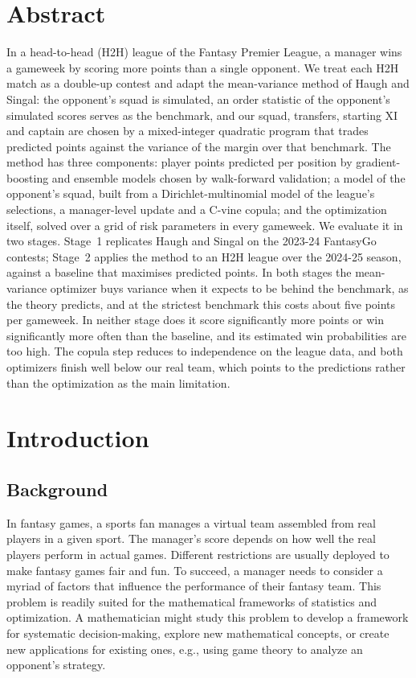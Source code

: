\documentclass[12pt,oneside,a4paper]{book}
\theoremstyle{definition}
\theoremstyle{remark}
\begin{document}
	\chapter*{Abstract}
	In a head-to-head (H2H) league of the Fantasy Premier League, a manager wins a gameweek by
	scoring more points than a single opponent. We treat each H2H match as a double-up contest and
	adapt the mean-variance method of Haugh and Singal: the opponent's squad is simulated, an
	order statistic of the opponent's simulated scores serves as the benchmark, and our squad,
	transfers, starting XI and captain are chosen by a mixed-integer quadratic program that trades
	predicted points against the variance of the margin over that benchmark. The method has three
	components: player points predicted per position by gradient-boosting and ensemble models
	chosen by walk-forward validation; a model of the opponent's squad, built from a
	Dirichlet-multinomial model of the league's selections, a manager-level update and a C-vine
	copula; and the optimization itself, solved over a grid of risk parameters in every gameweek.
	We evaluate it in two stages. Stage~1 replicates Haugh and Singal on the 2023-24 FantasyGo
	contests; Stage~2 applies the method to an H2H league over the 2024-25 season, against a
	baseline that maximises predicted points. In both stages the mean-variance optimizer buys
	variance when it expects to be behind the benchmark, as the theory predicts, and at the
	strictest benchmark this costs about five points per gameweek. In neither stage does it score
	significantly more points or win significantly more often than the baseline, and its estimated
	win probabilities are too high. The copula step reduces to independence on the league data, and
	both optimizers finish well below our real team, which points to the predictions rather than the
	optimization as the main limitation.

	\tableofcontents
	\listoffigures
	\listoftables

	\mainmatter
	\chapter{Introduction}
		\section{Background}
			In fantasy games, a sports fan manages a virtual team assembled from real players in a given sport. The manager’s score depends on how well the real players perform in actual games. Different restrictions are usually deployed to make fantasy games fair and fun. To succeed, a manager needs to consider a myriad of factors that influence the performance of their fantasy team. This problem is readily suited for the mathematical frameworks of statistics and optimization. A mathematician might study this problem to develop a framework for systematic decision-making, explore new mathematical concepts, or create new applications for existing ones, e.g., using game theory to analyze an opponent’s strategy.
\end{document}

